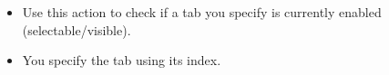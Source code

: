 \begin{itemize}
\item Use this action to check if a tab you specify is currently enabled (selectable/visible).
\item You specify the tab using its index. 
\end{itemize}

  
